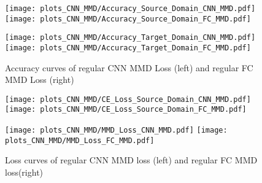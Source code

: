 \begin{figure}[p]
  \centering
  \texttt{[image: plots\_CNN\_MMD/Accuracy\_Source\_Domain\_CNN\_MMD.pdf]}
  \hspace{.3cm}
  \texttt{[image: plots\_CNN\_MMD/Accuracy\_Source\_Domain\_FC\_MMD.pdf]}

  \vspace{.1cm}

  \texttt{[image: plots\_CNN\_MMD/Accuracy\_Target\_Domain\_CNN\_MMD.pdf]}
  \hspace{.1cm}
  \texttt{[image: plots\_CNN\_MMD/Accuracy\_Target\_Domain\_FC\_MMD.pdf]}

  \caption{Accuracy curves of regular CNN MMD Loss (left) and regular FC MMD Loss (right)}
  \label{fig:accuracy_cnn_and_no_cnn_mmd}
\end{figure}





\begin{figure}[p]
  \centering
  \texttt{[image: plots\_CNN\_MMD/CE\_Loss\_Source\_Domain\_CNN\_MMD.pdf]}
  \hspace{.3cm}
  \texttt{[image: plots\_CNN\_MMD/CE\_Loss\_Source\_Domain\_FC\_MMD.pdf]}

  \vspace{.1cm}

  \texttt{[image: plots\_CNN\_MMD/MMD\_Loss\_CNN\_MMD.pdf]}
  \hspace{.1cm}
  \texttt{[image: plots\_CNN\_MMD/MMD\_Loss\_FC\_MMD.pdf]}

  \caption{Loss curves of regular CNN MMD loss (left) and regular FC MMD loss(right)}
  \label{fig:loss_cnn_and_no_cnn_mmd}
\end{figure}




